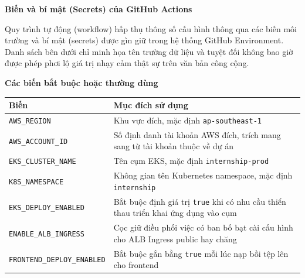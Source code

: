 \vspace{0.5em}\noindent\textbf{Biến và bí mật (Secrets) của GitHub
Actions}\par

Quy trình tự động (workflow) hấp thụ thông số cấu hình thông qua các
biến môi trường và bí mật (secrets) được gìn giữ trong hệ thống GitHub
Environment. Danh sách bên dưới chỉ minh họa tên trường dữ liệu và tuyệt
đối không bao giờ được phép phơi lộ giá trị nhạy cảm thật sự trên văn
bản công cộng.

\vspace{0.5em}\noindent\textbf{Các biến bắt buộc hoặc thường
dùng}\par

{
\begingroup
\small
\setlength{\tabcolsep}{3pt}
\renewcommand{\arraystretch}{1.15}
\begin{longtable}{@{}
  >{\raggedright\arraybackslash}p{}
  >{\raggedright\arraybackslash}p{}@{}}
\toprule\noalign{}
\begin{minipage}[b]{\linewidth}\raggedright
Biến
\end{minipage} & \begin{minipage}[b]{\linewidth}\raggedright
Mục đích sử dụng
\end{minipage} \\
\midrule\noalign{}
\endhead
\bottomrule\noalign{}
\endlastfoot
\texttt{AWS\_\allowbreak{}REGION} & Khu vực đích, mặc định \texttt{ap-\allowbreak{}southeast-\allowbreak{}1} \\
\texttt{AWS\_\allowbreak{}ACCOUNT\_\allowbreak{}ID} & Số định danh tài khoản AWS đích, trích mang
sang từ tài khoản thuộc về dự án \\
\texttt{EKS\_\allowbreak{}CLUSTER\_\allowbreak{}NAME} & Tên cụm EKS, mặc định
\texttt{internship-\allowbreak{}prod} \\
\texttt{K8S\_\allowbreak{}NAMESPACE} & Không gian tên Kubernetes namespace, mặc định
\texttt{internship} \\
\texttt{EKS\_\allowbreak{}DEPLOY\_\allowbreak{}ENABLED} & Bắt buộc định giá trị \texttt{true} khi
có nhu cầu thiển thau triển khai ứng dụng vào cụm \\
\texttt{ENABLE\_\allowbreak{}ALB\_\allowbreak{}INGRESS} & Cọc giữ điều phối việc có ban bố bạt cài
cấu hình cho ALB Ingress public hay chăng \\
\texttt{FRONTEND\_\allowbreak{}DEPLOY\_\allowbreak{}ENABLED} & Bắt buộc gắn bằng \texttt{true} mỗi
lúc nạp bồi tệp lên cho frontend \\

\end{longtable}}
